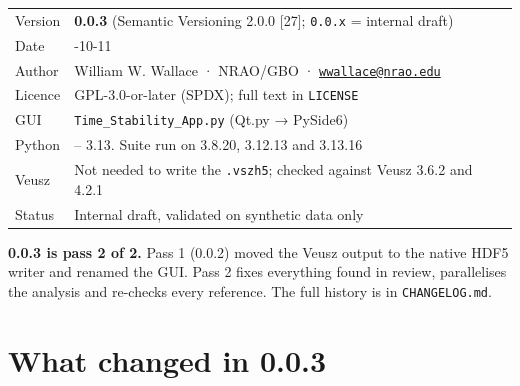 \documentclass[10pt,a4paper]{article}
\let\raggedright\RaggedRight}
\begin{document}
\begin{longtable}[]{@{}
  >{\raggedright\arraybackslash}p{}
  >{\raggedright\arraybackslash}p{}@{}}
\toprule\noalign{}
\endhead
\bottomrule\noalign{}
\endlastfoot
Version & \textbf{0.0.3} (Semantic Versioning 2.0.0 {[}27{]}; \texttt{0.0.x} = internal draft) \\
Date & 2026-10-11 \\
Author & William W. Wallace · NRAO/GBO · \href{mailto:wwallace@nrao.edu}{\nolinkurl{wwallace@nrao.edu}} \\
Licence & GPL-3.0-or-later (SPDX); full text in \texttt{LICENSE} \\
GUI & \texttt{Time\_\allowbreak{}Stability\_\allowbreak{}App.py} (Qt.py → PySide6) \\
Python & 3.8 -- 3.13. Suite run on 3.8.20, 3.12.13 and 3.13.16 \\
Veusz & Not needed to write the \texttt{.\allowbreak{}vszh5}; checked against Veusz 3.6.2 and 4.2.1 \\
Status & Internal draft, validated on synthetic data only \\
\end{longtable}

\textbf{0.0.3 is pass 2 of 2.} Pass 1 (0.0.2) moved the Veusz output to the native
HDF5 writer and renamed the GUI. Pass 2 fixes everything found in review,
parallelises the analysis and re-checks every reference. The full history is
in \texttt{CHANGELOG.md}.


\hypertarget{what-changed-in-003}{%
\section{What changed in 0.0.3}\label{what-changed-in-003}}
\end{document}
